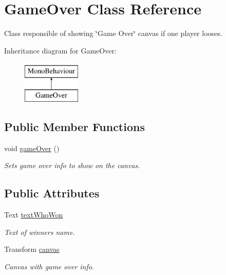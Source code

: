 \hypertarget{class_game_over}{}\section{Game\+Over Class Reference}
\label{class_game_over}


Class responsible of showing \char`\"{}\+Game Over\char`\"{} canvas if one player looses.  


Inheritance diagram for Game\+Over\+:\begin{figure}[H]
\begin{center}
\leavevmode
\includegraphics[height=2.000000cm]{class_game_over}
\end{center}
\end{figure}
\subsection*{Public Member Functions}
\begin{DoxyCompactItemize}
\item 
void \mbox{\hyperlink{class_game_over_a03d824dff5b997d7566f5e7bb5326609}{game\+Over}} ()
\begin{DoxyCompactList}\small\item\em Sets game over info to show on the canvas. \end{DoxyCompactList}\end{DoxyCompactItemize}
\subsection*{Public Attributes}
\begin{DoxyCompactItemize}
\item 
Text \mbox{\hyperlink{class_game_over_a05fc5c0c7a78b9a32de2bd9a9bfcac57}{text\+Who\+Won}}
\begin{DoxyCompactList}\small\item\em Text of winner\textquotesingle{}s name. \end{DoxyCompactList}\item 
Transform \mbox{\hyperlink{class_game_over_ad71e27e7f62da1f7abba74e31d89e9d5}{canvas}}
\begin{DoxyCompactList}\small\item\em Canvas with game over info. \end{DoxyCompactList}\end{DoxyCompactItemize}


